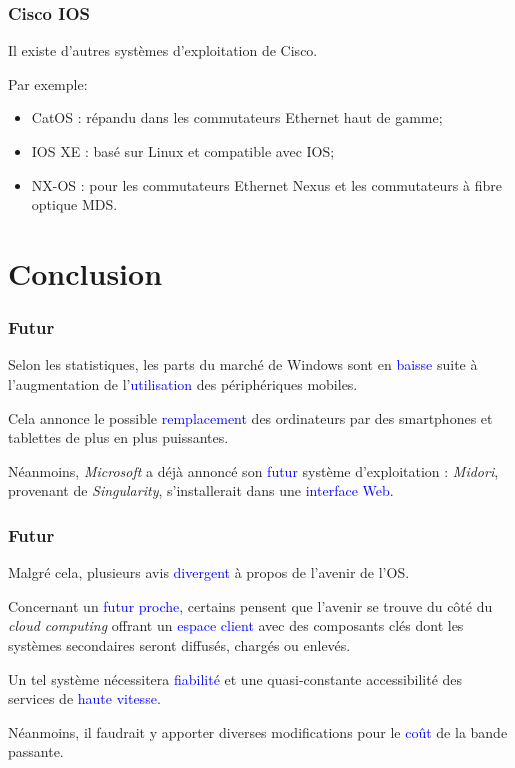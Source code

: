 \documentclass[aspectratio=169]{beamer}
\begin{document}
\begin{frame}
  \frametitle{Cisco IOS}
  Il existe d’autres systèmes d’exploitation de Cisco.

  \hspace{0.5cm}

  Par exemple:
  \begin{itemize}
    \item CatOS : répandu dans les commutateurs Ethernet haut de gamme;
    \item IOS XE : basé sur Linux et compatible avec IOS;
    \item NX-OS : pour les commutateurs Ethernet Nexus et les commutateurs à
      fibre optique MDS.
  \end{itemize}

\end{frame}

\section{Conclusion}

\begin{frame}
  \frametitle{Futur}
  Selon les statistiques, les parts du marché de Windows sont en
  \textcolor{blue}{baisse} suite à l'augmentation de
  l'\textcolor{blue}{utilisation} des périphériques mobiles.

  \hspace{0.5cm}

  Cela annonce le possible \textcolor{blue}{remplacement} des ordinateurs par
  des smartphones et tablettes de plus en plus puissantes.

  \hspace{0.5cm}

  Néanmoins, \textit{Microsoft} a déjà annoncé son \textcolor{blue}{futur}
  système d'exploitation : \textit{Midori}, provenant de \textit{Singularity},
  s'installerait dans une \textcolor{blue}{interface Web}.
\end{frame}

\begin{frame}
  \frametitle{Futur}
  Malgré cela, plusieurs avis \textcolor{blue}{divergent} à propos de l'avenir
  de l'OS.

  Concernant un \textcolor{blue}{futur proche}, certains pensent que l'avenir se
  trouve du côté du \textit{cloud computing} offrant un
  \textcolor{blue}{espace client} avec des composants clés dont les systèmes
  secondaires seront diffusés, chargés ou enlevés.

  \hspace{0.5cm}

  Un tel système nécessitera \textcolor{blue}{fiabilité} et une quasi-constante
  accessibilité des services de \textcolor{blue}{haute vitesse}.

  \hspace{0.5cm}

  Néanmoins, il faudrait y apporter diverses modifications pour le
  \textcolor{blue}{coût} de la bande passante.
\end{frame}
\end{document}
